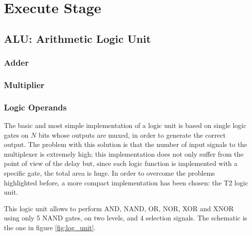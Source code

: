\chapter{Execute Stage}

\section{ALU: Arithmetic Logic Unit}
\subsection{Adder}
\subsection{Multiplier}
\subsection{Logic Operands}
The basic and most simple implementation of a logic unit is based on single logic gates on $N$ bits whose outputs are muxed, in order to generate the correct output. The problem with this solution is that the number of input signals to the multiplexer is extremely high; this implementation does not only suffer from the point of view of the delay but, since each logic function is implemented with a specific gate, the total area is huge.\newline\newline
In order to overcome the problems highlighted before, a more compact implementation has been chosen: the T2 logic unit.

This logic unit allows to perform AND, NAND, OR, NOR, XOR and XNOR using only 5 NAND gates, on two levels, and 4 selection signals. The schematic is the one in figure \ref{fig:log_unit}.

